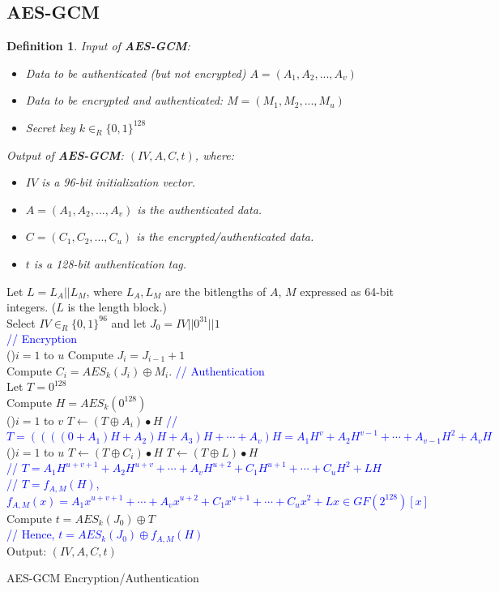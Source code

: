 \documentclass[12pt,titlepage]{article}
\newtheorem{protodefinition}[prototheorem]{Definition}
\newenvironment{definition}
{\colorlet{shadecolor}{cyan!15}\begin{shaded}\begin{protodefinition}\normalfont}{\end{protodefinition}\end{shaded}}
\begin{document}
\subsection{AES-GCM}
\begin{definition}
	Input of \textbf{AES-GCM}: \begin{itemize}
		\item Data to be authenticated (but not encrypted) $A = (A_1, A_2, ..., A_v)$
		\item Data to be encrypted and authenticated: $M = (M_1, M_2, ..., M_u)$
		\item Secret key $k \in_R \{0,1\}^{128}$
	\end{itemize}
	Output of \textbf{AES-GCM}: $(IV, A, C, t)$, where: \begin{itemize}
		\item $IV$ is a 96-bit initialization vector.
		\item $A = (A_1, A_2, ..., A_v)$ is the authenticated data.
		\item $C = (C_1 , C_2 , ..., C_u )$ is the encrypted/authenticated data.
		\item $t$ is a 128-bit authentication tag.
	\end{itemize}
\end{definition}

\begin{algorithm}
	Let $L = L_A || L_M $, where $L_A, L_M$ are the bitlengths of $A$, $M$ expressed as 64-bit integers. ($L$ is the length block.)\\
	Select $IV \in_R \{0,1\}^{96}$ and let $J_0 = IV || 0^{31} || 1$\\
	\textcolor{blue}{// Encryption}\\
	\For(){$i = 1$ to $u$}{
		Compute $J_i = J_{i-1} + 1$\\
		Compute $C_i = AES_k (J_i) \oplus M_i$.
	}
	\textcolor{blue}{// Authentication}\\
	Let $T = 0^{128}$\\
	Compute $H = AES_k (0^{128})$\\
	\For(){$i = 1$ to $v$}{
		$T \leftarrow (T \oplus A_i) \bullet H$
	}
	\textcolor{blue}{// $T = ((((0 + A_1)H + A_2)H + A_3)H + \cdots + A_v)H = A_1H^v + A_2H^{v-1} + \cdots + A_{v-1}H^2 + A_vH$}\\
	\For(){$i = 1$ to $u$}{
		$T \leftarrow (T \oplus C_i) \bullet H$
	}
	$T \leftarrow (T \oplus L) \bullet H$\\
	\textcolor{blue}{// $T = A_1H^{u+v+1} + A_2H^{u+v} + \cdots + A_vH^{u+2} + C_1H^{u+1} + \cdots + C_uH^2 + LH$}\\
	\textcolor{blue}{// $T = f_{A, M}(H)$, $f_{A, M}(x) = A_1x^{u+v+1} + \cdots + A_vx^{u+2} + C_1x^{u+1} + \cdots + C_ux^2+Lx \in GF(2^{128})[x]$}\\
	Compute $t = AES_k (J_0) \oplus T$\\
	\textcolor{blue}{// Hence, $t = AES_k(J_0) \oplus f_{A, M}(H)$}\\
	Output: $(IV, A, C, t)$
	\caption{AES-GCM Encryption/Authentication}
\end{algorithm}
\end{document}
